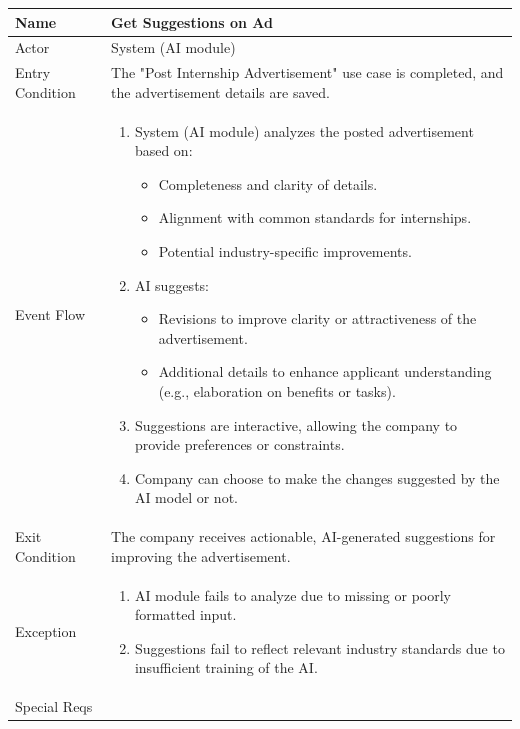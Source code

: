 \begin{table}[H]
\centering
\begin{tabular}{|l|p{12cm}|}
\hline
Name             & Get Suggestions on Ad \\ \hline
Actor            & System (AI module) \\ \hline
Entry Condition  & The "Post Internship Advertisement" use case is completed, and the advertisement details are saved. \\ \hline
Event Flow       & 
\begin{enumerate}
    \item System (AI module) analyzes the posted advertisement based on:
    \begin{itemize}
        \item Completeness and clarity of details.
        \item Alignment with common standards for internships.
        \item Potential industry-specific improvements.
    \end{itemize}
    \item AI suggests:
    \begin{itemize}
        \item Revisions to improve clarity or attractiveness of the advertisement.
        \item Additional details to enhance applicant understanding (e.g., elaboration on benefits or tasks).
    \end{itemize}
    \item Suggestions are interactive, allowing the company to provide preferences or constraints.
    \item Company can choose to make the changes suggested by the AI model or not.
\end{enumerate} \\ \hline
Exit Condition   & The company receives actionable, AI-generated suggestions for improving the advertisement. \\ \hline
Exception        & 
\begin{enumerate}
    \item AI module fails to analyze due to missing or poorly formatted input.
    \item Suggestions fail to reflect relevant industry standards due to insufficient training of the AI. 
\end{enumerate} \\ \hline
Special Reqs     & 
\begin{enumerate}

\end{enumerate}
\end{tabular}
\end{table}
